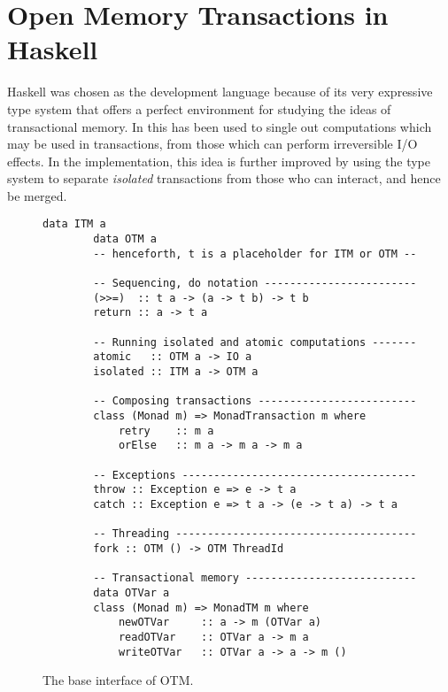 
\chapter{Open Memory Transactions in Haskell}

Haskell was chosen as the development language because of its very expressive type system that offers a perfect environment for studying the ideas of transactional memory.
In \cite{Harris:2005:CMT:1065944.1065952} this has been used to single out computations which may be used in transactions, from those which can perform irreversible I/O effects. 
In the implementation, this idea is further improved by using the type system to separate \emph{isolated} transactions from those who can interact, and hence be merged.

\begin{figure}
    \centering
    \begin{Verbatim}[tabsize=3, gobble=2]
        data ITM a
        data OTM a
        -- henceforth, t is a placeholder for ITM or OTM --
        
        -- Sequencing, do notation ------------------------
        (>>=)  :: t a -> (a -> t b) -> t b
        return :: a -> t a
        
        -- Running isolated and atomic computations -------
        atomic   :: OTM a -> IO a
        isolated :: ITM a -> OTM a
        
        -- Composing transactions -------------------------
        class (Monad m) => MonadTransaction m where
            retry    :: m a
            orElse   :: m a -> m a -> m a
        
        -- Exceptions -------------------------------------
        throw :: Exception e => e -> t a
        catch :: Exception e => t a -> (e -> t a) -> t a
        
        -- Threading --------------------------------------
        fork :: OTM () -> OTM ThreadId
        
        -- Transactional memory ---------------------------
        data OTVar a
        class (Monad m) => MonadTM m where
            newOTVar     :: a -> m (OTVar a)
            readOTVar    :: OTVar a -> m a
            writeOTVar   :: OTVar a -> a -> m ()

    \end{Verbatim}
    \caption{The base interface of OTM.}
    \label{fig:base-interface}
\end{figure}

